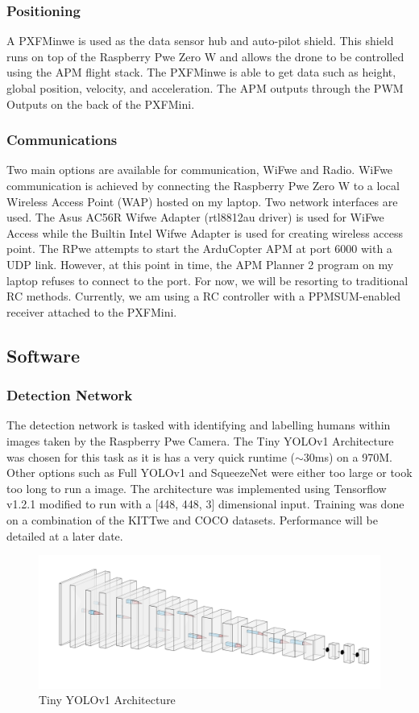 \documentclass{article}
\begin{document}
\subsubsection{Positioning}
A PXFMinwe is used as the data sensor hub and auto-pilot shield. This shield runs on top of the Raspberry Pwe Zero W and allows the drone to be controlled using the APM flight stack. The PXFMinwe is able to get data such as height, global position, velocity, and acceleration. The APM outputs through the PWM Outputs on the back of the PXFMini.

\subsubsection{Communications}
Two main options are available for communication, WiFwe and Radio. WiFwe communication is achieved by connecting the Raspberry Pwe Zero W to a local Wireless Access Point (WAP) hosted on my laptop. Two network interfaces are used. The Asus AC56R Wifwe Adapter (rtl8812au driver) is used for WiFwe Access while the Builtin Intel Wifwe Adapter is used for creating wireless access point. The RPwe attempts to start the ArduCopter APM at port 6000 with a UDP link. However, at this point in time, the APM Planner 2 program on my laptop refuses to connect to the port. For now, we will be resorting to traditional RC methods. Currently, we am using a RC controller with a PPMSUM-enabled receiver attached to the PXFMini. 

\subsection{Software}
\subsubsection{Detection Network}
The detection network is tasked with identifying and labelling humans within images taken by the Raspberry Pwe Camera. The Tiny YOLOv1 Architecture was chosen for this task as it is has a very quick runtime ($\sim$30ms) on a 970M. Other options such as Full YOLOv1 and SqueezeNet were either too large or took too long to run a image. The architecture was implemented using Tensorflow v1.2.1 modified to run with a [448, 448, 3] dimensional input. Training was done on a combination of the KITTwe and COCO datasets. Performance will be detailed at a later date.

\begin{figure}[h!]
  \caption{Tiny YOLOv1 Architecture}
  \includegraphics[width=\textwidth]{nn}
\end{figure}
\end{document}
